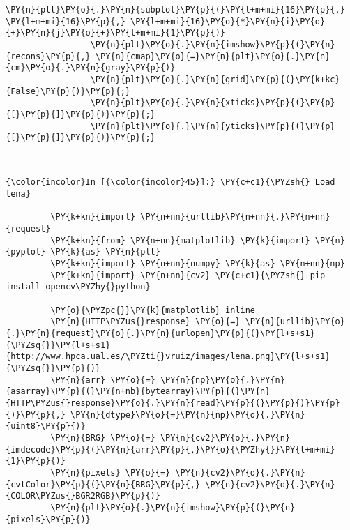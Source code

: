 \begin{Verbatim}[commandchars=\\\{\}]
                 \PY{n}{plt}\PY{o}{.}\PY{n}{subplot}\PY{p}{(}\PY{l+m+mi}{16}\PY{p}{,} \PY{l+m+mi}{16}\PY{p}{,} \PY{l+m+mi}{16}\PY{o}{*}\PY{n}{i}\PY{o}{+}\PY{n}{j}\PY{o}{+}\PY{l+m+mi}{1}\PY{p}{)}
                 \PY{n}{plt}\PY{o}{.}\PY{n}{imshow}\PY{p}{(}\PY{n}{recons}\PY{p}{,} \PY{n}{cmap}\PY{o}{=}\PY{n}{plt}\PY{o}{.}\PY{n}{cm}\PY{o}{.}\PY{n}{gray}\PY{p}{)}
                 \PY{n}{plt}\PY{o}{.}\PY{n}{grid}\PY{p}{(}\PY{k+kc}{False}\PY{p}{)}\PY{p}{;}
                 \PY{n}{plt}\PY{o}{.}\PY{n}{xticks}\PY{p}{(}\PY{p}{[}\PY{p}{]}\PY{p}{)}\PY{p}{;}
                 \PY{n}{plt}\PY{o}{.}\PY{n}{yticks}\PY{p}{(}\PY{p}{[}\PY{p}{]}\PY{p}{)}\PY{p}{;}
\end{Verbatim}


    \begin{center}
    \end{center}
    { \hspace*{\fill} \\}
    
    \begin{Verbatim}[commandchars=\\\{\}]
{\color{incolor}In [{\color{incolor}45}]:} \PY{c+c1}{\PYZsh{} Load lena}
         
         \PY{k+kn}{import} \PY{n+nn}{urllib}\PY{n+nn}{.}\PY{n+nn}{request}
         \PY{k+kn}{from} \PY{n+nn}{matplotlib} \PY{k}{import} \PY{n}{pyplot} \PY{k}{as} \PY{n}{plt}
         \PY{k+kn}{import} \PY{n+nn}{numpy} \PY{k}{as} \PY{n+nn}{np}
         \PY{k+kn}{import} \PY{n+nn}{cv2} \PY{c+c1}{\PYZsh{} pip install opencv\PYZhy{}python}
         
         \PY{o}{\PYZpc{}}\PY{k}{matplotlib} inline
         \PY{n}{HTTP\PYZus{}response} \PY{o}{=} \PY{n}{urllib}\PY{o}{.}\PY{n}{request}\PY{o}{.}\PY{n}{urlopen}\PY{p}{(}\PY{l+s+s1}{\PYZsq{}}\PY{l+s+s1}{http://www.hpca.ual.es/\PYZti{}vruiz/images/lena.png}\PY{l+s+s1}{\PYZsq{}}\PY{p}{)}
         \PY{n}{arr} \PY{o}{=} \PY{n}{np}\PY{o}{.}\PY{n}{asarray}\PY{p}{(}\PY{n+nb}{bytearray}\PY{p}{(}\PY{n}{HTTP\PYZus{}response}\PY{o}{.}\PY{n}{read}\PY{p}{(}\PY{p}{)}\PY{p}{)}\PY{p}{,} \PY{n}{dtype}\PY{o}{=}\PY{n}{np}\PY{o}{.}\PY{n}{uint8}\PY{p}{)}
         \PY{n}{BRG} \PY{o}{=} \PY{n}{cv2}\PY{o}{.}\PY{n}{imdecode}\PY{p}{(}\PY{n}{arr}\PY{p}{,}\PY{o}{\PYZhy{}}\PY{l+m+mi}{1}\PY{p}{)}
         \PY{n}{pixels} \PY{o}{=} \PY{n}{cv2}\PY{o}{.}\PY{n}{cvtColor}\PY{p}{(}\PY{n}{BRG}\PY{p}{,} \PY{n}{cv2}\PY{o}{.}\PY{n}{COLOR\PYZus{}BGR2RGB}\PY{p}{)}
         \PY{n}{plt}\PY{o}{.}\PY{n}{imshow}\PY{p}{(}\PY{n}{pixels}\PY{p}{)}
\end{Verbatim}


